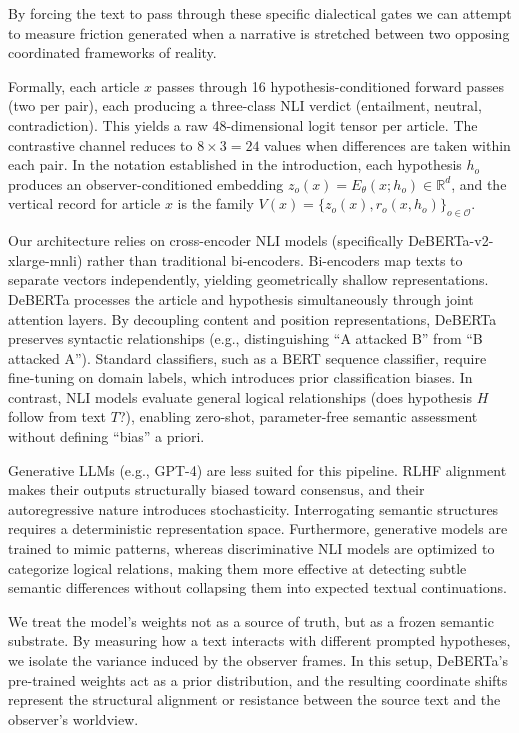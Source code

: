 By forcing the text to pass through these specific dialectical gates we can attempt to measure friction generated when a narrative is stretched between two opposing coordinated frameworks of reality.

Formally, each article $x$ passes through 16 hypothesis-conditioned forward passes (two per pair), each producing a three-class NLI verdict (entailment, neutral, contradiction). This yields a raw 48-dimensional logit tensor per article. The contrastive channel reduces to $8 \times 3 = 24$ values when differences are taken within each pair. In the notation established in the introduction, each hypothesis $h_o$ produces an observer-conditioned embedding $z_o(x) = E_\theta(x; h_o) \in \mathbb{R}^d$, and the vertical record for article $x$ is the family $V(x) = \{z_o(x), r_o(x, h_o)\}_{o \in \mathcal{O}}$.

Our architecture relies on cross-encoder NLI models (specifically DeBERTa-v2-xlarge-mnli) rather than traditional bi-encoders. Bi-encoders map texts to separate vectors independently, yielding geometrically shallow representations. DeBERTa processes the article and hypothesis simultaneously through joint attention layers. By decoupling content and position representations, DeBERTa preserves syntactic relationships (e.g., distinguishing ``A attacked B'' from ``B attacked A''). Standard classifiers, such as a BERT sequence classifier, require fine-tuning on domain labels, which introduces prior classification biases. In contrast, NLI models evaluate general logical relationships (does hypothesis $H$ follow from text $T$?), enabling zero-shot, parameter-free semantic assessment without defining ``bias'' a priori.

Generative LLMs (e.g., GPT-4) are less suited for this pipeline. RLHF alignment makes their outputs structurally biased toward consensus, and their autoregressive nature introduces stochasticity. Interrogating semantic structures requires a deterministic representation space. Furthermore, generative models are trained to mimic patterns, whereas discriminative NLI models are optimized to categorize logical relations, making them more effective at detecting subtle semantic differences without collapsing them into expected textual continuations.

We treat the model's weights not as a source of truth, but as a frozen semantic substrate. By measuring how a text interacts with different prompted hypotheses, we isolate the variance induced by the observer frames. In this setup, DeBERTa's pre-trained weights act as a prior distribution, and the resulting coordinate shifts represent the structural alignment or resistance between the source text and the observer's worldview.

